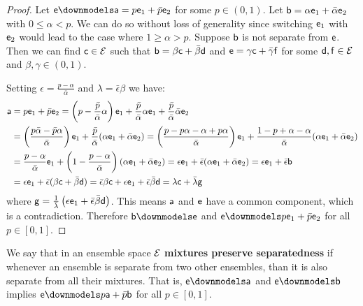 \begin{proof}
	Let $\ens \separate \ens[a] = p \ens_1 + \bar{p} \ens_2$ for some $p \in (0, 1)$. Let $\ens[b] = \alpha \ens_1 + \bar{\alpha} \ens_2$ with $0 \leq \alpha < p$. We can do so without loss of generality since switching $\ens_1$ with $\ens_2$ would lead to the case where $1 \geq \alpha > p$. Suppose $\ens[b]$ is not separate from $\ens$. Then we can find $\ens[c] \in \Ens$ such that $\ens[b] = \beta \ens[c] + \bar{\beta} \ens[d]$ and $\ens = \gamma \ens[c] + \bar{\gamma} \ens[f]$ for some $\ens[d], \ens[f] \in \Ens$ and $\beta, \gamma \in (0, 1)$.
	
	Setting $\epsilon = \frac{p - \alpha}{\bar{\alpha}}$ and $\lambda = \bar{\epsilon} \beta$ we have:
	\begin{align*}
		\ens[a] &= p \ens_1 + \bar{p} \ens_2 = \left(p - \frac{\bar{p}}{\bar{\alpha}} \alpha \right) \ens_1 + \frac{\bar{p}}{\bar{\alpha}} \alpha \ens_1 + \frac{\bar{p}}{\bar{\alpha}} \bar{\alpha}\ens_2 \\
		&= \left(\frac{p\bar{\alpha} - \bar{p}\alpha}{\bar{\alpha}} \right) \ens_1 + \frac{\bar{p}}{\bar{\alpha}} (\alpha \ens_1 + \bar{\alpha} \ens_2) = \left(\frac{p - p\alpha - \alpha + p \alpha}{\bar{\alpha}} \right) \ens_1 + \frac{1 - p + \alpha - \alpha}{\bar{\alpha}} (\alpha \ens_1 + \bar{\alpha} \ens_2) \\
		&= \frac{p - \alpha}{\bar{\alpha}}  \ens_1 + \left( 1 - \frac{p - \alpha}{\bar{\alpha}}\right) (\alpha \ens_1 + \bar{\alpha} \ens_2) = \epsilon \ens_1 + \bar{\epsilon} (\alpha \ens_1 + \bar{\alpha} \ens_2) = \epsilon \ens_1 + \bar{\epsilon} \ens[b] \\
		&= \epsilon \ens_1 + \bar{\epsilon} ( \beta \ens[c] + \bar{\beta} \ens[d] ) = \bar{\epsilon} \beta \ens[c] + \epsilon \ens_1 + \bar{\epsilon} \bar{\beta} \ens[d] = \lambda \ens[c] + \bar{\lambda} \ens[g]
	\end{align*}
	where $\ens[g] = \frac{1}{\bar{\lambda}}\left( \epsilon \ens_1 + \bar{\epsilon} \bar{\beta} \ens[d] \right)$. This means $\ens[a]$ and $\ens$ have a common component, which is a contradiction. Therefore $\ens[b] \separate \ens$ and $\ens \separate p \ens_1 + \bar{p} \ens_2$ for all $p \in [0, 1]$.
\end{proof}

\begin{defn}
	We say that in an ensemble space $\Ens$ \textbf{mixtures preserve separatedness} if whenever an ensemble is separate from two other ensembles, than it is also separate from all their mixtures. That is, $\ens \separate \ens[a]$ and $\ens \separate \ens[b]$ implies $\ens \separate p \ens[a] + \bar{p} \ens[b]$ for all $p \in [0,1]$.
\end{defn}

